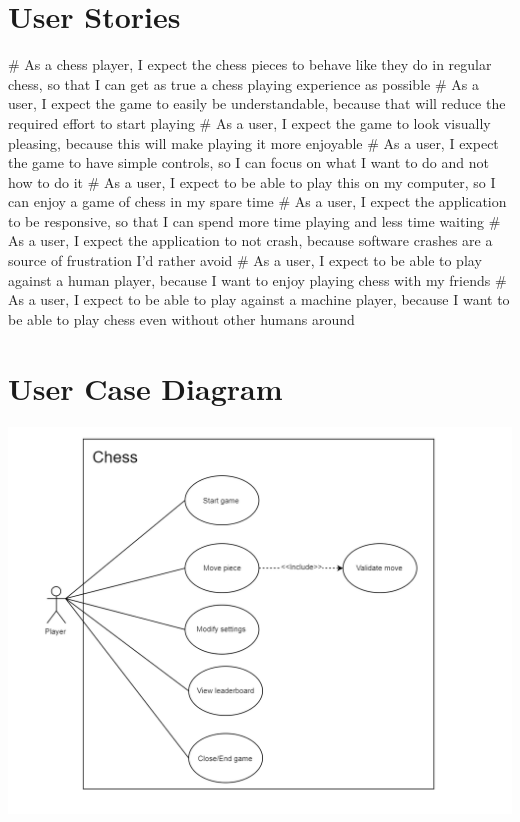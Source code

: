\documentclass{article}
\begin{document}
\section*{User Stories}

\begin{easylist}[itemize]
# As a chess player, I expect the chess pieces to behave like they do in regular chess, so that I can get as true a chess playing experience as possible
# As a user, I expect the game to easily be understandable, because that will reduce the required effort to start playing
# As a user, I expect the game to look visually pleasing, because this will make playing it more enjoyable
# As a user, I expect the game to have simple controls, so I can focus on what I want to do and not how to do it
# As a user, I expect to be able to play this on my computer, so I can enjoy a game of chess in my spare time
# As a user, I expect the application to be responsive, so that I can spend more time playing and less time waiting
# As a user, I expect the application to not crash, because software crashes are a source of frustration I'd rather avoid
# As a user, I expect to be able to play against a human player, because I want to enjoy playing chess with my friends
# As a user, I expect to be able to play against a machine player, because I want to be able to play chess even without other humans around
\end{easylist}

\section*{User Case Diagram}
\includegraphics[width=15cm]{usecasediagram}
\end{document}
